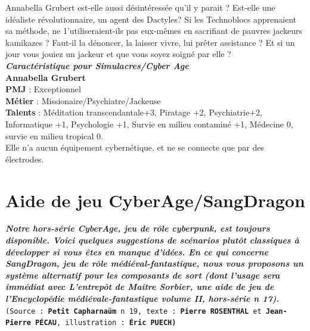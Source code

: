 \documentclass[11pt,twoside,a4paper]{article}
\begin{document}
\begin{multicols}{2}
{Annabella Grubert est-elle aussi d{\'e}sint{\'e}ress{\'e}e qu'il y parait ? Est-elle une id{\'e}aliste r{\'e}volutionnaire, un agent des Dactyles? Si les Technoblocs apprenaient sa m{\'e}thode, ne 1'utiliseraient-ils pas eux-m{\^e}mes en sacrifiant de pauvres jackeurs kamikazes ? Faut-il la d{\'e}noncer, la laisser vivre, lui pr{\^e}ter assistance ? Et si un jour vous jouiez un jackeur et que vous soyez soign{\'e} par elle ?~\\

\textbf{\large \emph{Caract{\'e}ristique pour Simulacres/Cyber Age}}~\\

\textbf{\large Annabella Grubert}~\\

\textbf{PMJ} : Exceptionnel~\\
\textbf{M{\'e}tier} : Missionaire/Psychiatre/Jackeuse~\\
\textbf{Talents} : M{\'e}ditation transcendantale+3, Piratage +2, Psychiatrie+2, Informatique +1, Psychologie +1, Survie en milieu contamin{\'e} +1, M{\'e}decine 0, survie en milieu tropical 0.~\\
Elle n'a aucun {\'e}quipement cybern{\'e}tique, et ne se connecte que par des {\'e}lectrodes.~\\

} %
\end{multicols} 

\clearpage

\section{Aide de jeu CyberAge/SangDragon}

\textbf{\textit{\small Notre hors-s{\'e}rie \emph{CyberAge}, jeu de r{\^o}le cyberpunk, est toujours disponible. Voici quelques suggestions de sc{\'e}narios plut{\^o}t classiques {\`a} d{\'e}velopper si vous {\^e}tes en manque d'id{\'e}es. En ce qui concerne SangDragon, jeu de r{\^o}le m{\'e}di{\'e}val-fantastique, nous vous proposons un syst{\`e}me alternatif pour les composants de sort (dont l'usage sera imm{\'e}diat avec L'entrep{\^o}t de Ma{\^i}tre Sorbier, une aide de jeu de l'Encyclop{\'e}die m{\'e}di{\'e}vale-fantastique volume II, hors-s{\'e}rie n 17). }}~\\

\texttt{\scriptsize{(Source : \textbf{Petit Capharna{\"u}m} n 19, texte : \textbf{Pierre ROSENTHAL} et \textbf{Jean-Pierre P{\'E}CAU}, illustration : \textbf{{\'E}ric PUECH)} }}~\\
\end{document}
